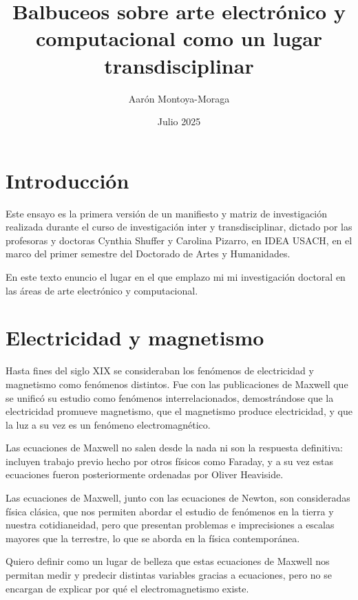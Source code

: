 \documentclass{article}
\title{Balbuceos sobre arte electrónico y computacional como un lugar transdisciplinar}
\author{Aarón Montoya-Moraga}
\date{Julio 2025}
\begin{document}
\maketitle

\renewcommand*\contentsname{Tabla de contenidos}

\tableofcontents

\section{Introducción}

Este ensayo es la primera versión de un manifiesto y matriz de investigación realizada durante el curso de investigación inter y transdisciplinar, dictado por las profesoras y doctoras Cynthia Shuffer y Carolina Pizarro, en IDEA USACH, en el marco del primer semestre del Doctorado de Artes y Humanidades.

En este texto enuncio el lugar en el que emplazo mi mi investigación doctoral en las áreas de arte electrónico y computacional.

\section{Electricidad y magnetismo}

Hasta fines del siglo XIX se consideraban los fenómenos de electricidad y magnetismo como fenómenos distintos. Fue con las publicaciones de Maxwell que se unificó su estudio como fenómenos interrelacionados, demostrándose que la electricidad promueve magnetismo, que el magnetismo produce electricidad, y que la luz a su vez es un fenómeno electromagnético.

Las ecuaciones de Maxwell no salen desde la nada ni son la respuesta definitiva: incluyen trabajo previo hecho por otros físicos como Faraday, y a su vez estas ecuaciones fueron posteriormente ordenadas por Oliver Heaviside.

Las ecuaciones de Maxwell, junto con las ecuaciones de Newton, son consideradas física clásica, que nos permiten abordar el estudio de fenómenos en la tierra y nuestra cotidianeidad, pero que presentan problemas e imprecisiones a escalas mayores que la terrestre, lo que se aborda en la física contemporánea.

Quiero definir como un lugar de belleza que estas ecuaciones de Maxwell nos permitan medir y predecir distintas variables gracias a ecuaciones, pero no se encargan de explicar por qué el electromagnetismo existe.
\end{document}
